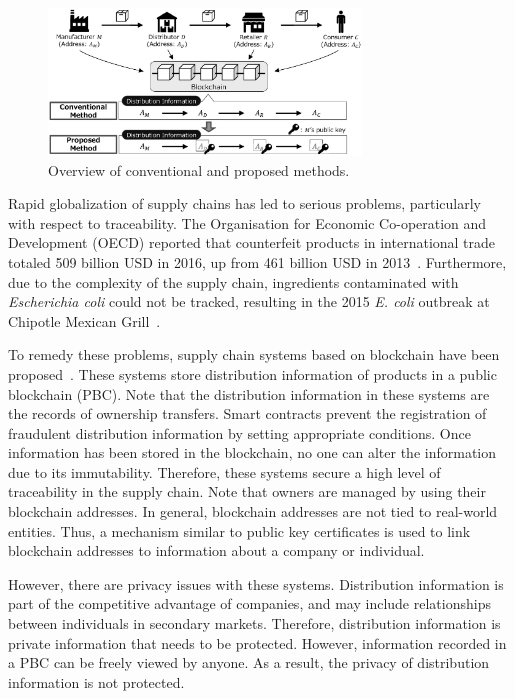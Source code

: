 \documentclass[conference]{IEEEtran}
\begin{document}
\begin{figure}[b]
    \centering
    \includegraphics[width=0.74\textwidth]{outline.eps}
    \caption{Overview of conventional and proposed methods.
    \label{fig:outline}}
\end{figure}



Rapid globalization of supply chains has led to serious problems, particularly with respect to traceability.
The Organisation for Economic Co-operation and Development (OECD) reported that counterfeit products in international trade totaled 509 billion USD in 2016, up from 461 billion USD in 2013~\cite{OECD/EUIPO2019}.
Furthermore, due to the complexity of the supply chain, ingredients contaminated with \textit{Escherichia coli} could not be tracked, resulting in the 2015 \textit{E. coli} outbreak at Chipotle Mexican Grill~\cite{chipotle}.

To remedy these problems, supply chain systems based on blockchain have been proposed~\cite{Toyoda2017, TRU, HZL19}.
These systems store distribution information of products in a public blockchain (PBC).
Note that the distribution information in these systems are the records of ownership transfers.
Smart contracts prevent the registration of fraudulent distribution information by setting appropriate conditions.
Once information has been stored in the blockchain, no one can alter the information due to its immutability.
Therefore, these systems secure a high level of traceability in the supply chain.
Note that owners are managed by using their blockchain addresses.
In general, blockchain addresses are not tied to real-world entities.
Thus, a mechanism similar to public key certificates is used to link blockchain addresses to information about a company or individual.



However, there are privacy issues with these systems.
Distribution information is part of the competitive advantage of companies, and may include relationships between individuals in secondary markets.
Therefore, distribution information is private information that needs to be protected.
However, information recorded in a PBC can be freely viewed by anyone.
As a result, the privacy of distribution information is not protected.
\end{document}
